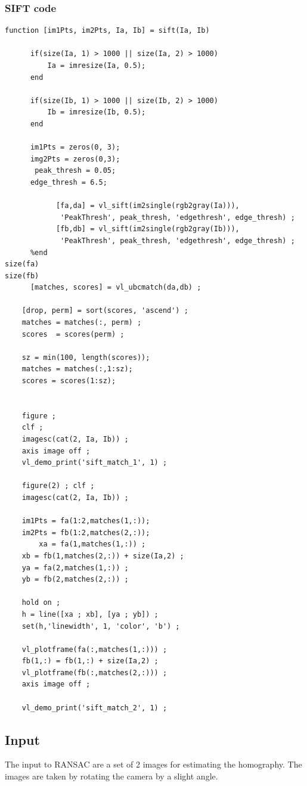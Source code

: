 \documentclass[12pt]{article}
\begin{document}
\subsubsection{SIFT code}
\begin{lstlisting}
function [im1Pts, im2Pts, Ia, Ib] = sift(Ia, Ib)
    
      if(size(Ia, 1) > 1000 || size(Ia, 2) > 1000)
          Ia = imresize(Ia, 0.5);
      end
     
      if(size(Ib, 1) > 1000 || size(Ib, 2) > 1000)
          Ib = imresize(Ib, 0.5);
      end
      
      im1Pts = zeros(0, 3);
      img2Pts = zeros(0,3);
       peak_thresh = 0.05;
      edge_thresh = 6.5;
      
            [fa,da] = vl_sift(im2single(rgb2gray(Ia))),
             'PeakThresh', peak_thresh, 'edgethresh', edge_thresh) ;
            [fb,db] = vl_sift(im2single(rgb2gray(Ib))),
             'PeakThresh', peak_thresh, 'edgethresh', edge_thresh) ;
      %end
size(fa)
size(fb)
      [matches, scores] = vl_ubcmatch(da,db) ;

    [drop, perm] = sort(scores, 'ascend') ;
    matches = matches(:, perm) ;
    scores  = scores(perm) ;

    sz = min(100, length(scores));
    matches = matches(:,1:sz);
    scores = scores(1:sz);


    figure ; 
    clf ;
    imagesc(cat(2, Ia, Ib)) ;
    axis image off ;
    vl_demo_print('sift_match_1', 1) ;

    figure(2) ; clf ;
    imagesc(cat(2, Ia, Ib)) ;

    im1Pts = fa(1:2,matches(1,:));
    im2Pts = fb(1:2,matches(2,:));
        xa = fa(1,matches(1,:)) ;
    xb = fb(1,matches(2,:)) + size(Ia,2) ;
    ya = fa(2,matches(1,:)) ;
    yb = fb(2,matches(2,:)) ;

    hold on ;
    h = line([xa ; xb], [ya ; yb]) ;
    set(h,'linewidth', 1, 'color', 'b') ;

    vl_plotframe(fa(:,matches(1,:))) ;
    fb(1,:) = fb(1,:) + size(Ia,2) ;
    vl_plotframe(fb(:,matches(2,:))) ;
    axis image off ;

    vl_demo_print('sift_match_2', 1) ;
\end{lstlisting}
\vspace{2em}
\subsection{Input}
The input to RANSAC are a set of 2 images for estimating the homography. The images are taken by rotating the camera by a slight angle.
\end{document}

